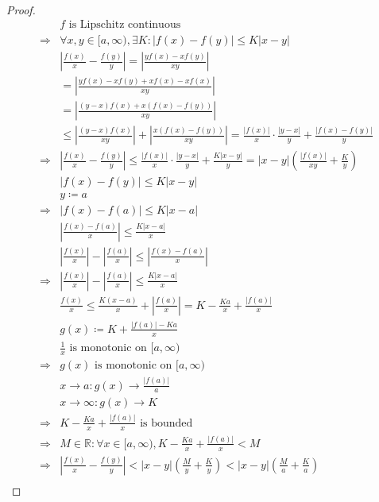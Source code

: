 \documentclass{article}
\begin{document}
~

\begin{proof}
    \begin{align*}
        &f\text{ is Lipschitz continuous}\\
        \Rightarrow&\forall x,y\in [a,\infty),\exists K:|f(x)-f(y)|\leqslant K|x-y|\\
        &\left|\frac{f(x)}{x}-\frac{f(y)}{y}\right|=\left|\frac{yf(x)-xf(y)}{xy}\right|\\
        &=\left|\frac{yf(x)-xf(y)+xf(x)-xf(x)}{xy}\right|\\
        &=\left|\frac{(y-x)f(x)+x(f(x)-f(y))}{xy}\right|\\
        &\leqslant\left|\frac{(y-x)f(x)}{xy}\right|+\left|\frac{x(f(x)-f(y))}{xy}\right|=\frac{|f(x)|}{x}\cdot \frac{|y-x|}{y}+\frac{|f(x)-f(y)|}{y}\\
        \Rightarrow&\left|\frac{f(x)}{x}-\frac{f(y)}{y}\right|\leqslant \frac{|f(x)|}{x}\cdot \frac{|y-x|}{y}+\frac{K|x-y|}{y}=|x-y|\left(\frac{|f(x)|}{xy}+\frac{K}{y}\right)\\
        &|f(x)-f(y)|\leqslant K|x-y|\\
        &y\coloneqq a\\
        \Rightarrow&|f(x)-f(a)|\leqslant K|x-a|\\
        &\left|\frac{f(x)-f(a)}{x}\right|\leqslant \frac{K|x-a|}{x}\\
        &\left|\frac{f(x)}{x}\right|-\left|\frac{f(a)}{x}\right|\leqslant\left|\frac{f(x)-f(a)}{x}\right|\\
        \Rightarrow&\left|\frac{f(x)}{x}\right|-\left|\frac{f(a)}{x}\right|\leqslant\frac{K|x-a|}{x}\\
        &\frac{f(x)}{x}\leqslant\frac{K(x-a)}{x}+\left|\frac{f(a)}{x}\right|=K-\frac{Ka}{x}+\frac{|f(a)|}{x}\\
        &g(x)\coloneqq K+\frac{|f(a)|-Ka}{x}\\
        &\frac{1}{x}\text{ is monotonic on }[a,\infty)\\
       \Rightarrow&g(x)\text{ is monotonic on }[a,\infty)\\
        &x\to a:g(x)\to\frac{|f(a)|}{a}\\
        &x\to \infty: g(x)\to K\\
        \Rightarrow&K-\frac{Ka}{x}+\frac{|f(a)|}{x}\text{ is bounded}\\
        \Rightarrow&M\in\mathbb{R}:\forall x\in [a,\infty),K-\frac{Ka}{x}+\frac{|f(a)|}{x}<M\\
        \Rightarrow&\left|\frac{f(x)}{x}-\frac{f(y)}{y}\right|<|x-y|\left(\frac{M}{y}+\frac{K}{y}\right)<|x-y|\left(\frac{M}{a}+\frac{K}{a}\right)\\

\end{align*}
\end{proof}
\end{document}
